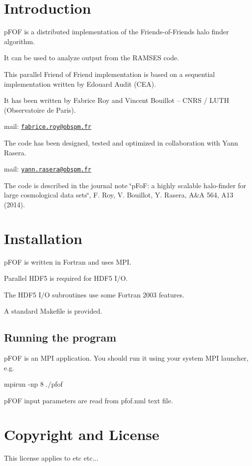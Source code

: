 \hypertarget{index_intro_sec}{}\section{Introduction}\label{index_intro_sec}
p\-F\-O\-F is a distributed implementation of the Friends-\/of-\/\-Friends halo finder algorithm. \par
 It can be used to analyze output from the R\-A\-M\-S\-E\-S code. \par
 This parallel Friend of Friend implementation is based on a sequential implementation written by Edouard Audit (C\-E\-A). \par
 It has been written by Fabrice Roy and Vincent Bouillot -- C\-N\-R\-S / L\-U\-T\-H (Observatoire de Paris). \par
 mail\-: \href{mailto:fabrice.roy@obspm.fr}{\tt fabrice.\-roy@obspm.\-fr} \par


The code has been designed, tested and optimized in collaboration with Yann Rasera. \par
 mail\-: \href{mailto:yann.rasera@obspm.fr}{\tt yann.\-rasera@obspm.\-fr} \par
 The code is described in the journal note \char`\"{}p\-Fo\-F\-: a highly scalable halo-\/finder for large cosmological data sets\char`\"{}, F. Roy, V. Bouillot, Y. Rasera, A\&A 564, A13 (2014).\hypertarget{index_install_sec}{}\section{Installation}\label{index_install_sec}
p\-F\-O\-F is written in Fortran and uses M\-P\-I. \par
 Parallel H\-D\-F5 is required for H\-D\-F5 I/\-O. \par
 The H\-D\-F5 I/\-O subroutines use some Fortran 2003 features. \par
 A standard Makefile is provided. \hypertarget{index_running}{}\subsection{Running the program}\label{index_running}
p\-F\-O\-F is an M\-P\-I application. You should run it using your system M\-P\-I launcher, e.\-g. \par
 mpirun -\/np 8 ./pfof

p\-F\-O\-F input parameters are read from pfof.\-nml text file.\hypertarget{index_copyright}{}\section{Copyright and License}\label{index_copyright}
This license applies to etc etc...

\par
\par
 